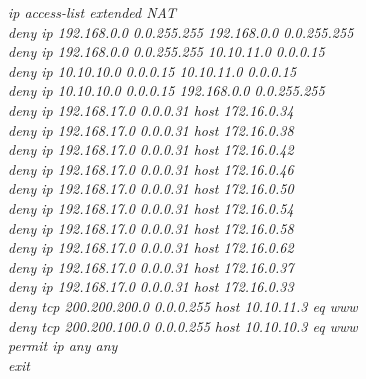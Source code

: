 \documentclass[a4paper, 12pt]{article}
\begin{document}
\hspace*{2cm}\textit{ip access-list extended NAT\\
\hspace*{2cm}deny ip 192.168.0.0 0.0.255.255 192.168.0.0 0.0.255.255\\
\hspace*{2cm}deny ip 192.168.0.0 0.0.255.255 10.10.11.0 0.0.0.15\\
\hspace*{2cm}deny ip 10.10.10.0 0.0.0.15 10.10.11.0 0.0.0.15\\
\hspace*{2cm}deny ip 10.10.10.0 0.0.0.15 192.168.0.0 0.0.255.255\\
\hspace*{2cm}deny ip 192.168.17.0 0.0.0.31 host 172.16.0.34\\
\hspace*{2cm}deny ip 192.168.17.0 0.0.0.31 host 172.16.0.38\\
\hspace*{2cm}deny ip 192.168.17.0 0.0.0.31 host 172.16.0.42\\
\hspace*{2cm}deny ip 192.168.17.0 0.0.0.31 host 172.16.0.46\\
\hspace*{2cm}deny ip 192.168.17.0 0.0.0.31 host 172.16.0.50\\
\hspace*{2cm}deny ip 192.168.17.0 0.0.0.31 host 172.16.0.54\\
\hspace*{2cm}deny ip 192.168.17.0 0.0.0.31 host 172.16.0.58\\
\hspace*{2cm}deny ip 192.168.17.0 0.0.0.31 host 172.16.0.62\\
\hspace*{2cm}deny ip 192.168.17.0 0.0.0.31 host 172.16.0.37\\
\hspace*{2cm}deny ip 192.168.17.0 0.0.0.31 host 172.16.0.33\\
\hspace*{2cm}deny tcp 200.200.200.0 0.0.0.255 host 10.10.11.3 eq www\\
\hspace*{2cm}deny tcp 200.200.100.0 0.0.0.255 host 10.10.10.3 eq www\\
\hspace*{2cm}permit ip any any\\
\hspace*{2cm}exit\\
}
\end{document}
